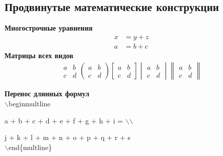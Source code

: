 \documentclass[a4paper, 14pt]{extarticle}
\newcommand{\n}{\par}
\begin{document}
	\subsection*{Продвинутые математические конструкции} 
	\textbf{Многострочные уравнения} 
	\begin{align}
		x &= y + z \label{eq1} \\
		a &= b + c \label{eq2}
	\end{align}
	\textbf{Матрицы всех видов} 
	\begin{align}
	\begin{matrix}  a & b \\ c & d \end{matrix}
	\begin{pmatrix} a & b \\ c & d \end{pmatrix}
	\begin{bmatrix} a & b \\ c & d \end{bmatrix}
	\begin{vmatrix} a & b \\ c & d \end{vmatrix}
	\begin{Vmatrix} a & b \\ c & d \end{Vmatrix}
	\end{align}
	
	\textbf{Перенос длинных формул}\\
	$\backslash$begin{multline}\n
		a + b + c + d + e + f + g + h + i = $\backslash$$\backslash$\n
		j + k + l + m + n + o + p + q + r + s\\
	$\backslash$end\{multline\}
	
\end{document}
